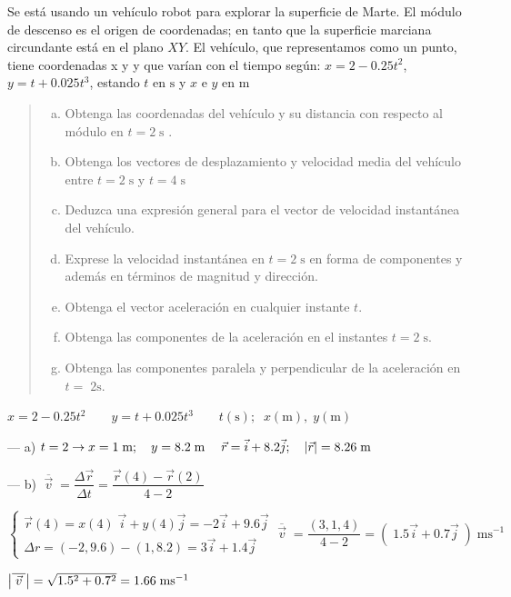 \begin{prob}
Se está usando un vehículo robot para explorar la superficie de Marte. El módulo de descenso es el origen de coordenadas; en tanto que la superficie marciana circundante está en el plano $XY$. El vehículo, que representamos como un punto, tiene coordenadas x y y que varían con el tiempo según: $x=2-0.25t^2$, $y=t+0.025t^3$, estando $t$ en $\mathrm{s}$ y $x$ e $y$ en $\mathrm{m}$ 
\begin{quote}
\begin{enumerate}[a) ]
\item Obtenga las coordenadas del vehículo y su distancia con respecto al módulo en $t=2\;\mathrm{s}$ . 
\item Obtenga los vectores de desplazamiento y velocidad media del vehículo entre $t=2\;\mathrm{s}$ y $t=4\;\mathrm{s}$
\item Deduzca una expresión general para el vector de velocidad instantánea del vehículo. 
\item Exprese la velocidad instantánea en $t=2\; \mathrm{s}$ en forma de componentes y además en términos de magnitud y dirección.  
\item Obtenga el vector aceleración en cualquier instante $t$.
\item Obtenga las componentes de la aceleración en el instantes $t=2\; \mathrm{s}$. 
\item Obtenga las componentes paralela y perpendicular de la aceleración en $t = \;2 \mathrm{s}$. 
\end{enumerate}
\end{quote}	
\end{prob}
 $x=2-0.25t^2\qquad y=t+0.025t^3 \qquad t(\mathrm{s});\;\; x(\mathrm{m}),\; y(\mathrm{m})$
 
 --- a) $t=2\to x=1\;\mathrm{m};\quad y=8.2\; \mathrm{m}\; \quad \vec r=\vec i+8.2\vec j; \quad \abs{\vec r}=8.26\; \mathrm{m}$
 
 --- b) $\displaystyle \overline{\;\vec v\; }=\dfrac{\Delta \vec r}{\Delta t}=\dfrac{\vec r(4)-\vec r(2)}{4-2}$
 
$ \begin{cases}
 \vec r(4)=x(4)\; \vec i+ y(4)\vec j=-2 \vec i +9.6 \vec j
 \\
 \Delta r=(-2,9.6)-(1,8.2)=3\vec i+1.4\vec j 
\end{cases}
\displaystyle \overline{\;\vec v\; }=\dfrac {(3,1,4)}{4-2}=(\;1.5\vec i+0.7\vec j\;)\; \mathrm{ms}^{-1}$

$\abs{\displaystyle \overline{\;\vec v\; }}=\sqrt{1.5^2+0.7^2}=1.66\; \mathrm{ms}^{-1}$

